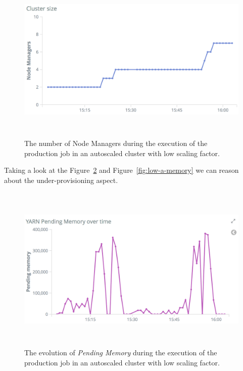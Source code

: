 \documentclass[12pt,twoside,cucitura]{toptesi}
\begin{document}
\begin{figure}
\centering
\includegraphics[height=80mm]{low-size}
\caption{The number of Node Managers during the execution of the production job in an autoscaled cluster with low scaling factor.}\label{fig:low-size}
\end{figure}

Taking a look at the Figure~\ref{fig:low-p-memory} and Figure~\ref{fig:low-a-memory} we can reason about the under-provisioning aspect.

\begin{figure}
\centering
\includegraphics[height=80mm]{low-p-memory}
\caption{The evolution of \textit{Pending Memory} during the execution of the production job in an autoscaled cluster with low scaling factor.}\label{fig:low-p-memory}
\end{figure}
\end{document}

